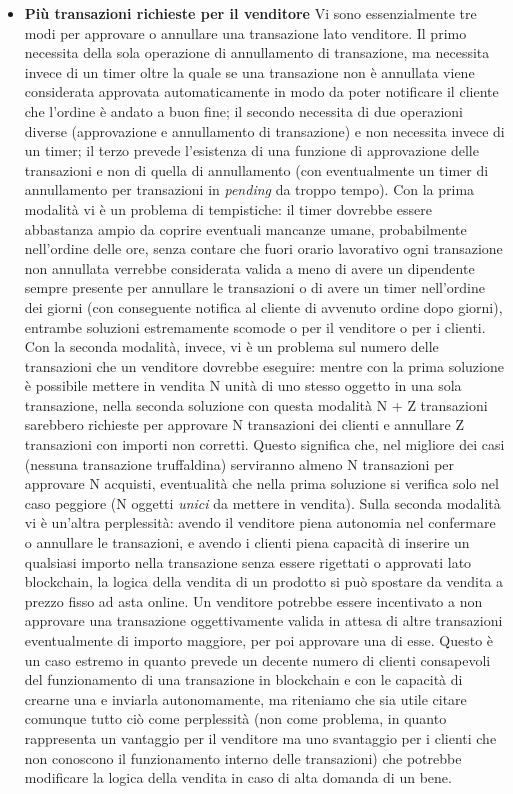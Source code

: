 \documentclass[a4paper, 12pt]{article}
\begin{document}
\begin{itemize}
\item \textbf{Più transazioni richieste per il venditore}
Vi sono essenzialmente tre modi per approvare o annullare una transazione lato venditore.
Il primo necessita della sola operazione di annullamento di transazione, ma necessita invece di un timer oltre la quale se una transazione non è annullata viene considerata approvata automaticamente in modo da poter notificare il cliente che l'ordine è andato a buon fine; il secondo necessita di due operazioni diverse (approvazione e annullamento di transazione) e non necessita invece di un timer; il terzo prevede l'esistenza di una funzione di approvazione delle transazioni e non di quella di annullamento (con eventualmente un timer di annullamento per transazioni in \textit{pending} da troppo tempo).
Con la prima modalità vi è un problema di tempistiche: il timer dovrebbe essere abbastanza ampio da coprire eventuali mancanze umane, probabilmente nell'ordine delle ore, senza contare che fuori orario lavorativo ogni transazione non annullata verrebbe considerata valida a meno di avere un dipendente sempre presente per annullare le transazioni o di avere un timer nell'ordine dei giorni (con conseguente notifica al cliente di avvenuto ordine dopo giorni), entrambe soluzioni estremamente scomode o per il venditore o per i clienti.
\newpage
Con la seconda modalità, invece, vi è un problema sul numero delle transazioni che un venditore dovrebbe eseguire: mentre con la prima soluzione è possibile mettere in vendita N unità di uno stesso oggetto in una sola transazione, nella seconda soluzione con questa modalità N + Z transazioni sarebbero richieste per approvare N transazioni dei clienti e annullare Z transazioni con importi non corretti.
Questo significa che, nel migliore dei casi (nessuna transazione truffaldina) serviranno almeno N transazioni per approvare N acquisti, eventualità che nella prima soluzione si verifica solo nel caso peggiore (N oggetti \textit{unici} da mettere in vendita).
Sulla seconda modalità vi è un'altra perplessità: avendo il venditore piena autonomia nel confermare o annullare le transazioni, e avendo i clienti piena capacità di inserire un qualsiasi importo nella transazione senza essere rigettati o approvati lato blockchain, la logica della vendita di un prodotto si può spostare da vendita a prezzo fisso ad asta online. Un venditore potrebbe essere incentivato a non approvare una transazione oggettivamente valida in attesa di altre transazioni eventualmente di importo maggiore, per poi approvare una di esse. Questo è un caso estremo in quanto prevede un decente numero di clienti consapevoli del funzionamento di una transazione in blockchain e con le capacità di crearne una e inviarla autonomamente, ma riteniamo che sia utile citare comunque tutto ciò come perplessità (non come problema, in quanto rappresenta un vantaggio per il venditore ma uno svantaggio per i clienti che non conoscono il funzionamento interno delle transazioni) che potrebbe modificare la logica della vendita in caso di alta domanda di un bene.

\end{itemize}
\end{document}

